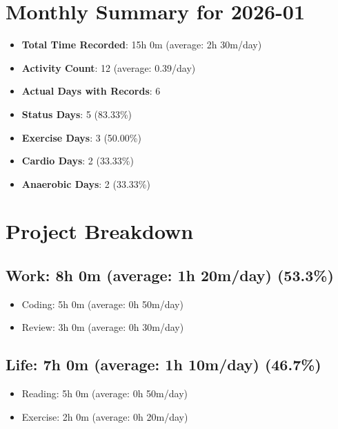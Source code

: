 \documentclass[12pt]{extarticle}
\begin{document}
{\fontsize{18}{21.6}\selectfont\section*{Monthly Summary for 2026-01}}

\begin{itemize}[topsep=0pt, itemsep=-0.5ex]
    \item \textbf{Total Time Recorded}: 15h 0m (average: 2h 30m/day)
    \item \textbf{Activity Count}: 12 (average: 0.39/day)
    \item \textbf{Actual Days with Records}: 6
    \item \textbf{Status Days}: 5 (83.33\%)
    \item \textbf{Exercise Days}: 3 (50.00\%)
    \item \textbf{Cardio Days}: 2 (33.33\%)
    \item \textbf{Anaerobic Days}: 2 (33.33\%)
\end{itemize}

{\fontsize{16}{19.2}\selectfont\section*{Project Breakdown}}

{\fontsize{16}{19.2}\selectfont\subsection*{Work: 8h 0m (average: 1h 20m/day) (53.3\%)}}
\begin{itemize}[topsep=0pt, itemsep=-0.5ex]
    \item Coding: 5h 0m (average: 0h 50m/day)
    \item Review: 3h 0m (average: 0h 30m/day)
\end{itemize}
{\fontsize{16}{19.2}\selectfont\subsection*{Life: 7h 0m (average: 1h 10m/day) (46.7\%)}}
\begin{itemize}[topsep=0pt, itemsep=-0.5ex]
    \item Reading: 5h 0m (average: 0h 50m/day)
    \item Exercise: 2h 0m (average: 0h 20m/day)
\end{itemize}
\end{document}
